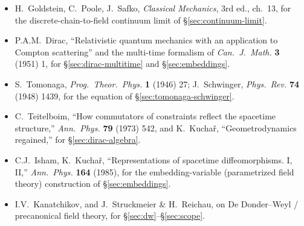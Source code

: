 \documentclass[11pt]{book}
\theoremstyle{definition}
\theoremstyle{remark}
\begin{document}
\begin{itemize}
\item H.~Goldstein, C.~Poole, J.~Safko, \textit{Classical Mechanics}, 3rd ed., ch.~13, for the discrete-chain-to-field continuum limit of \S\ref{sec:continuum-limit}.
\item P.A.M.~Dirac, ``Relativistic quantum mechanics with an application to Compton scattering'' and the multi-time formalism of \emph{Can.\ J.\ Math.} \textbf{3} (1951) 1, for \S\ref{sec:dirac-multitime} and \S\ref{sec:embeddings}.
\item S.~Tomonaga, \emph{Prog.\ Theor.\ Phys.} \textbf{1} (1946) 27; J.~Schwinger, \emph{Phys.\ Rev.} \textbf{74} (1948) 1439, for the equation of \S\ref{sec:tomonaga-schwinger}.
\item C.~Teitelboim, ``How commutators of constraints reflect the spacetime structure,'' \emph{Ann.\ Phys.} \textbf{79} (1973) 542, and K.~Kucha\v{r}, ``Geometrodynamics regained,'' for \S\ref{sec:dirac-algebra}.
\item C.J.~Isham, K.~Kucha\v{r}, ``Representations of spacetime diffeomorphisms. I, II,'' \emph{Ann.\ Phys.} \textbf{164} (1985), for the embedding-variable (parametrized field theory) construction of \S\ref{sec:embeddings}.
\item I.V.~Kanatchikov, and J.~Struckmeier \& H.~Reichau, on De Donder--Weyl / precanonical field theory, for \S\ref{sec:dw}--\S\ref{sec:scope}.
\end{itemize}
\end{document}
